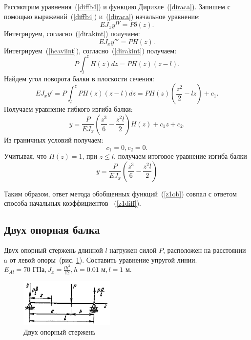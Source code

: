 \documentclass[12pt, a4paper]{article}
\begin{document}
Рассмотрим уравнения~(\ref{diffb4}) и функцию Дирихле~(\ref{diraca}). Запишем с помощью выражений~(\ref{diffb4}) и~(\ref{diraca}) начальное уравнение:
\begin{equation}
	\label{z123112}
	E J_{x} y^{IV} = P \delta (z).
\end{equation} 
Интегрируем, согласно~(\ref{dirakint}) получаем: 
\begin{equation}
	\label{z12312312}
	E J_{x} y''' = P H (z).
\end{equation}
Интегрируем~(\ref{heaviint}), согласно~(\ref{dirakint}) получаем:
\begin{equation}
	\label{z312312}
	P \int_l^z  H (z) dz = P H (z) (z - l).
\end{equation}
Найдем угол поворота балки в плоскости сечения:
\begin{equation}
	\label{z31231}
	E J_{x} y' = P \int_l^z P H (z) (z - l) dz = P H(z)(\frac{z^2}{2} - l z) + c_1.
\end{equation}
Получаем уравнение гибкого изгиба балки:
\begin{equation}
	\label{z3123}
	y = \frac{P}{E J_{x}} (\frac{z^3}{6} - \frac{z^2 l}{2}) H(z) + c_1 z + c_2.
\end{equation}
Из граничных условий получаем:
\begin{equation}
	\label{z312233}
	c_1 = 0, c_2 = 0.
\end{equation}
Учитывая, что $H(z) = 1 \mbox{, при } z \leqslant l$, получаем итоговое уравнение изгиба балки
 \begin{equation}
	\label{z1ob}
	y = \frac{P}{E J_{x}} (\frac{z^3}{6} - \frac{z^2  l}{2})
\end{equation}

Таким образом, ответ метода обобщенных функций~(\ref{z1ob}) совпал с ответом способа начальных коэффициентов ~(\ref{z1diff}).
\subsection{Двух опорная балка}
Двух опорный стержень длинной $l$ нагружен силой $P$, расположен на расстоянии a от левой опоры~(рис. \ref{pic8}). Составить уравнение упругой линии.  $E_{Al} = 70 \mbox{ ГПа}, J_{x} = \frac{l h^3}{12}, h = 0.01 \mbox{ м}, l = 1 \mbox{ м}$.

\begin{figure}[!h]
	\centering
	\includegraphics[width=0.42\textwidth]{pic.8}%
	\caption{Двух опорный стержень}
	\vspace*{-2mm}
	\label{pic8}
\end{figure}
\end{document}
